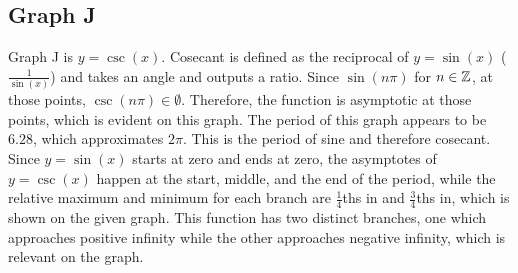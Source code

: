 \subsection{Graph J}

Graph J is ${y=\csc(x)}$.
Cosecant is defined as the reciprocal of ${y=\sin(x)}$ (${\frac{1}{\sin(x)}}$) and takes an angle and outputs a ratio.
Since ${\sin(n\pi)}$ for ${n \in \mathbb{Z}}$, at those points, ${{\csc(n\pi)} \in \emptyset}$.
Therefore, the function is asymptotic at those points, which is evident on this graph.
The period of this graph appears to be ${6.28}$, which approximates ${2\pi}$.
This is the period of sine and therefore cosecant.
Since ${y=\sin(x)}$ starts at zero and ends at zero, the asymptotes of ${y = \csc(x)}$ happen at the start, middle, and the end of the period, while the relative maximum and minimum for each branch are ${\frac{1}{4}}$ths in and ${\frac{3}{4}}$ths in, which is shown on the given graph.
This function has two distinct branches, one which approaches positive infinity while the other approaches negative infinity, which is relevant on the graph.
